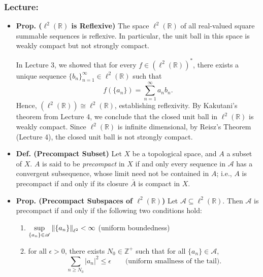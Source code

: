 \documentclass{article}
\begin{document}
\subsubsection{Lecture:}
\begin{itemize}
	\item \textbf{Prop. ($\ell^{2}(\mathbb{R})$ is Reflexive)} The space $\ell^{2}(\mathbb{R})$ of all real-valued square summable sequences is reflexive. In particular, the unit ball in this space is weakly compact but not strongly compact. 
	
	\begin{solutions}
		In Lecture 3, we showed that for every $f \in (\ell^{2}(\mathbb{R}))^{\ast}$, there exists a unique sequence $\{b_{n}\}_{n = 1}^{\infty} \in \ell^{2}(\mathbb{R})$ such that 
			\begin{equation}
				f(\{a_{n}\}) = \sum_{n = 1}^{\infty}a_{n}b_{n}. 
			\end{equation} 
		Hence, $(\ell^{2}(\mathbb{R})) \cong \ell^{2}(\mathbb{R})$, establishing reflexivity. By Kakutani's theorem from Lecture 4, we conclude that the closed unit ball in $\ell^{2}(\mathbb{R})$ is weakly compact. Since $\ell^{2}(\mathbb{R})$ is infinite dimensional, by Reisz's Theorem (Lecture 4), the closed unit ball is not strongly compact. 
	\end{solutions}
	
	\item \textbf{Def. (Precompact Subset)} Let $X$ be a topological space, and $A$ a subset of $X$. $A$ is said to be \textit{precompact} in $X$ if and only every sequence in $\mathscr{A}$ has a convergent subsequence, whose limit need not be contained in $A$; i.e., $A$ is precompact if and only if its closure $\bar{A}$ is compact in $X$. 
	
	\item \textbf{Prop. (Precompact Subspaces of $\ell^{2}(\mathbb{R})$)} Let $\mathscr{A} \subseteq \ell^{2}(\mathbb{R})$. Then $\mathscr{A}$ is precompact if and only if the following two conditions hold: 
		\begin{enumerate}[itemsep =-2pt,label = (\arabic{*})]
			\item $\sup\limits_{\{a_{n}\} \in \mathscr{A}}\left\Vert \{a_{n}\} \right\Vert_{\ell^{2}} < \infty$ (uniform boundedness) 
			\item for all $\epsilon > 0$, there exists $N_{0} \in \mathbb{Z}^{+}$ such that for all $\{a_{n}\} \in \mathscr{A}$, 
				\begin{equation}
					\sum_{n\geq N_{0}}|a_{n}|^{2} \leq \epsilon \qquad \text{(uniform smallness of the tail)}.
				\end{equation}
		\end{enumerate}


\end{itemize}
\end{document}
